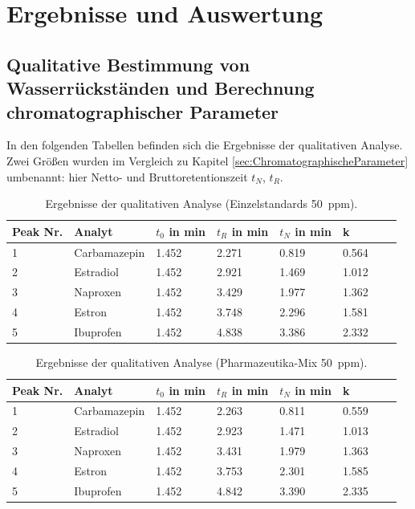 \section{Ergebnisse und Auswertung}
  
  \subsection{Qualitative Bestimmung von Wasserrückständen und Berechnung chromatographischer Parameter} 
    
    In den folgenden Tabellen befinden sich die Ergebnisse der qualitativen Analyse. Zwei Größen wurden im Vergleich zu Kapitel \ref{sec:ChromatographischeParameter} umbenannt: hier Netto- und Bruttoretentionszeit $t_N$, $t_R$.
    
    \begin{table}[H]
      \centering
      \caption[Ergebnisse der qualitativen Analyse (Einzelstandards), Quelle: Autor]{Ergebnisse der qualitativen Analyse (Einzelstandards \SI[mode=text]{50}{ppm}).}
      
      \label{tab:ErgebnisseEinzelstandards}
      \begin{tabular}{@{}l|lllllp{4.5cm}l@{}}
        \toprule
          Peak Nr. & Analyt & $t_0$ in \si{\minute} & $t_R$ in \si{\minute} & $t_N$ in \si{\minute}  & k \\ \midrule
          1 & Carbamazepin & 1.452 & 2.271 & 0.819 & 0.564 \\
          2 & Estradiol & 1.452 & 2.921 & 1.469 & 1.012 \\
          3 & Naproxen & 1.452 & 3.429 & 1.977 & 1.362 \\
          4 & Estron & 1.452 & 3.748 & 2.296 & 1.581 \\
          5 & Ibuprofen & 1.452 & 4.838 & 3.386 & 2.332 \\ \bottomrule
      \end{tabular}
    \end{table}  
    
    \begin{table}[H]
      \centering
      \caption[Ergebnisse der qualitativen Analyse (Pharmazeutika-Mix), Quelle: Autor]{Ergebnisse der qualitativen Analyse (Pharmazeutika-Mix \SI[mode=text]{50}{ppm}).}
      
      \label{tab:ErgebnissePharmamix}
      \begin{tabular}{@{}l|lllllp{4.5cm}l@{}}
        \toprule
          Peak Nr. & Analyt & $t_0$ in \si{\minute} & $t_R$ in \si{\minute} & $t_N$ in \si{\minute}  & k \\ \midrule
          1 & Carbamazepin & 1.452 & 2.263 & 0.811 & 0.559 \\
          2 & Estradiol & 1.452 & 2.923 & 1.471 & 1.013 \\
          3 & Naproxen & 1.452 & 3.431 & 1.979 & 1.363 \\
          4 & Estron & 1.452 & 3.753 & 2.301 & 1.585 \\
          5 & Ibuprofen & 1.452 & 4.842 & 3.390 & 2.335 \\ \bottomrule
      \end{tabular}
    \end{table}  
    
